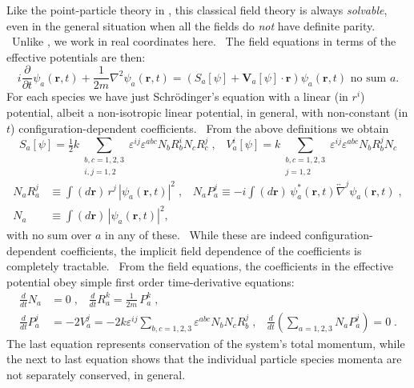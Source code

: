 \documentclass[a4paper,12pt]{article}%
\begin{document}
Like the point-particle theory in \cite{CPZ}, this classical field theory is
always \emph{solvable}, even in the general situation when all the fields do
\emph{not} have definite parity. \ Unlike \cite{CPZ}, we work in real
coordinates here. \ The field equations in terms of the effective potentials
are then:%
\[
i\frac{\partial}{\partial t}\psi_{a}\left(  \mathbf{r},t\right)  +\frac{1}%
{2m}\nabla^{2}\psi_{a}\left(  \mathbf{r},t\right)  =\left(  S_{a}\left[
\psi\right]  +\mathbf{V}_{a}[\psi]\cdot\mathbf{r}\right)  \psi_{a}\left(
\mathbf{r},t\right)  \text{ \ \ \ \ no sum }a\text{.}%
\]
For each species we have just Schr\"{o}dinger's equation with a linear (in
$r^{i}$) potential, albeit a non-isotropic linear potential, in general, with
non-constant (in $t$) configuration-dependent coefficients. \ From the above
definitions we obtain
\[
S_{a}\left[  \psi\right]  =\tfrac{1}{2}k\sum_{\substack{b,c=1,2,3\\i,j=1,2}%
}\varepsilon^{ij}\varepsilon^{abc}N_{b}R_{b}^{i}N_{c}R_{c}^{j}\;,\;\;\;V_{a}%
^{i}\left[  \psi\right]  =k\sum_{\substack{b,c=1,2,3\\j=1,2}}\varepsilon
^{ij}\varepsilon^{abc}N_{b}R_{b}^{j}N_{c}%
\]%
\begin{align*}
N_{a}R_{a}^{j} &  \equiv\int\left(  d\mathbf{r}\right)  \,r^{j}\,\left|
\psi_{a}\left(  \mathbf{r},t\right)  \right|  ^{2}\;,\;\;\;N_{a}P_{a}%
^{j}\equiv-i\int\left(  d\mathbf{r}\right)  \,\psi_{a}^{\ast}\left(
\mathbf{r},t\right)  \overleftrightarrow{\nabla}^{j}\psi_{a}\left(
\mathbf{r},t\right)  \;,\\
N_{a} &  \equiv\int\left(  d\mathbf{r}\right)  \,\left|  \psi_{a}\left(
\mathbf{r},t\right)  \right|  ^{2},
\end{align*}
with no sum over $a$ in any of these. \ While these are indeed
configuration-dependent coefficients, the implicit field dependence of the
coefficients is completely tractable. \ From the field equations, the
coefficients in the effective potential obey simple first order
time-derivative equations:%
\begin{align*}
\frac{d}{dt}N_{a} &  =0\;,\;\;\;\frac{d}{dt}R_{a}^{k}=\frac{1}{2m}\,P_{a}%
^{k}\;,\;\\
\frac{d}{dt}P_{a}^{j} &  =-2V_{a}^{j}=-2k\varepsilon^{ij}\sum_{b,c=1,2,3}%
\varepsilon^{abc}N_{b}N_{c}R_{b}^{j}\;,\;\;\;\frac{d}{dt}\left(
\sum_{a=1,2,3}N_{a}P_{a}^{j}\right)  =0\;.
\end{align*}
The last equation represents conservation of the system's total momentum,
while the next to last equation shows that the individual particle species
momenta are not separately conserved, in general.
\end{document}
